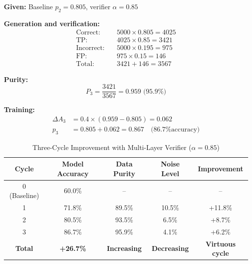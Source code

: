 \documentclass[12pt,a4paper]{article}
\theoremstyle{definition}
\begin{document}
\begin{examplebox}[title=Cycle 3 Detailed Calculation]

\textbf{Given:} Baseline $p_2 = 0.805$, verifier $\alpha = 0.85$

\textbf{Generation and verification:}
\begin{align}
\text{Correct:} \quad & 5000 \times 0.805 = 4025 \\
\text{TP:} \quad & 4025 \times 0.85 = 3421 \\
\text{Incorrect:} \quad & 5000 \times 0.195 = 975 \\
\text{FP:} \quad & 975 \times 0.15 = 146 \\
\text{Total:} \quad & 3421 + 146 = 3567
\end{align}

\textbf{Purity:}
\begin{equation}
P_3 = \frac{3421}{3567} = 0.959 \text{ (95.9\%)}
\end{equation}

\textbf{Training:}
\begin{align}
\Delta A_3 &= 0.4 \times (0.959 - 0.805) = 0.062 \\
p_3 &= 0.805 + 0.062 = 0.867 \quad \text{(86.7\% accuracy)}
\end{align}
\end{examplebox}

\begin{table}[htbp]
\centering
\caption{Three-Cycle Improvement with Multi-Layer Verifier ($\alpha = 0.85$)}
\begin{tabular}{ccccc}
\toprule
\textbf{Cycle} & \textbf{Model Accuracy} & \textbf{Data Purity} & \textbf{Noise Level} & \textbf{Improvement} \\
\midrule
0 (Baseline) & 60.0\% & -- & -- & -- \\
1 & 71.8\% & 89.5\% & 10.5\% & +11.8\% \\
2 & 80.5\% & 93.5\% & 6.5\% & +8.7\% \\
3 & 86.7\% & 95.9\% & 4.1\% & +6.2\% \\
\midrule
\textbf{Total} & \textbf{+26.7\%} & \textbf{Increasing} & \textbf{Decreasing} & \textbf{Virtuous cycle} \\
\bottomrule
\end{tabular}
\end{table}
\end{document}
